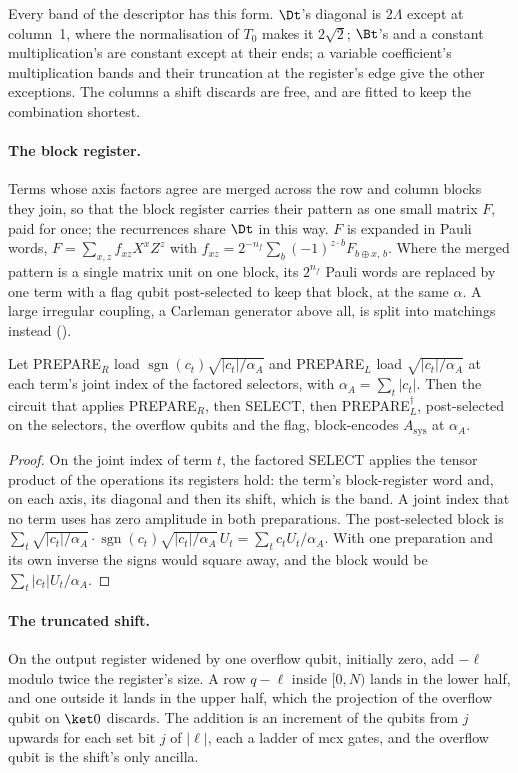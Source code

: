 Every band of the descriptor has this form. $\Dt$'s diagonal is $2\Lambda$ except at column~1, where the normalisation of $T_0$ makes it $2\sqrt2$; $\Bt$'s and a constant multiplication's are constant except at their ends; a variable coefficient's multiplication bands and their truncation at the register's edge give the other exceptions. The columns a shift discards are free, and are fitted to keep the combination shortest.

\paragraph{The block register.} Terms whose axis factors agree are merged across the row and column blocks they join, so that the block register carries their pattern as one small matrix $F$, paid for once; the recurrences share $\Dt$ in this way. $F$ is expanded in Pauli words, $F=\sum_{x,z}f_{xz}X^xZ^z$ with $f_{xz}=2^{-n_f}\sum_b(-1)^{z\cdot b}F_{b\oplus x,\,b}$. Where the merged pattern is a single matrix unit on one block, its $2^{n_f}$ Pauli words are replaced by one term with a flag qubit post-selected to keep that block, at the same $\alpha$. A large irregular coupling, a Carleman generator above all, is split into matchings instead ().

\begin{proposition}[Compilation]
\label{prop:term-ir-compilation}
Let PREPARE$_R$ load $\operatorname{sgn}(c_t)\sqrt{|c_t|/\alpha_A}$ and PREPARE$_L$ load $\sqrt{|c_t|/\alpha_A}$ at each term's joint index of the factored selectors, with $\alpha_A=\sum_t|c_t|$. Then the circuit that applies PREPARE$_R$, then SELECT, then PREPARE$_L^\dagger$, post-selected on the selectors, the overflow qubits and the flag, block-encodes $A_{\mathrm{sys}}$ at $\alpha_A$.
\end{proposition}
\begin{proof}
On the joint index of term $t$, the factored SELECT applies the tensor product of the operations its registers hold: the term's block-register word and, on each axis, its diagonal and then its shift, which is the band. A joint index that no term uses has zero amplitude in both preparations. The post-selected block is $\sum_t\sqrt{|c_t|/\alpha_A}\cdot\operatorname{sgn}(c_t)\sqrt{|c_t|/\alpha_A}\,U_t=\sum_tc_tU_t/\alpha_A$. With one preparation and its own inverse the signs would square away, and the block would be $\sum_t|c_t|U_t/\alpha_A$.
\end{proof}

\paragraph{The truncated shift.} On the output register widened by one overflow qubit, initially zero, add $-\ell$ modulo twice the register's size. A row $q-\ell$ inside $[0,N)$ lands in the lower half, and one outside it lands in the upper half, which the projection of the overflow qubit on $\ket0$ discards. The addition is an increment of the qubits from $j$ upwards for each set bit $j$ of $|\ell|$, each a ladder of \gls{mcx} gates, and the overflow qubit is the shift's only ancilla.

